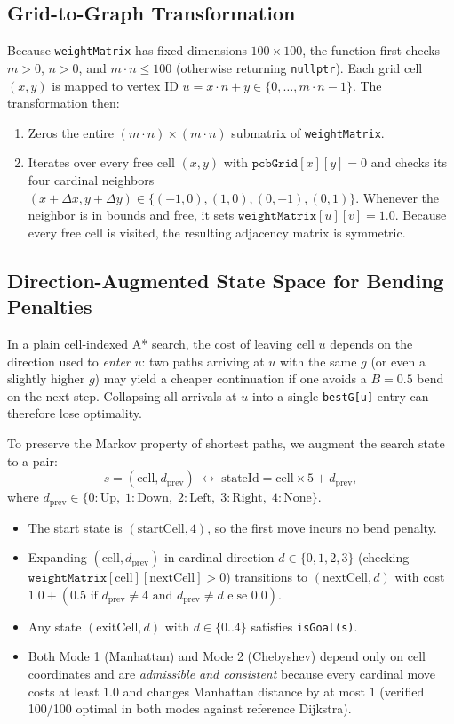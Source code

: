 \documentclass[11pt,a4paper]{article}
\begin{document}
\subsection{Grid-to-Graph Transformation}
Because \texttt{weightMatrix} has fixed dimensions $100 \times 100$, the function first checks $m > 0$, $n > 0$, and $m \cdot n \le 100$ (otherwise returning \texttt{nullptr}). Each grid cell $(x,y)$ is mapped to vertex ID $u = x \cdot n + y \in \{0, \dots, m \cdot n - 1\}$. The transformation then:
\begin{enumerate}
    \item Zeros the entire $(m \cdot n) \times (m \cdot n)$ submatrix of \texttt{weightMatrix}.
    \item Iterates over every free cell $(x,y)$ with $\texttt{pcbGrid}[x][y] = 0$ and checks its four cardinal neighbors $(x+\Delta x, y+\Delta y) \in \{(-1,0),(1,0),(0,-1),(0,1)\}$. Whenever the neighbor is in bounds and free, it sets $\texttt{weightMatrix}[u][v] = 1.0$. Because every free cell is visited, the resulting adjacency matrix is symmetric.
\end{enumerate}

\subsection{Direction-Augmented State Space for Bending Penalties}
In a plain cell-indexed A* search, the cost of leaving cell $u$ depends on the direction used to \emph{enter} $u$: two paths arriving at $u$ with the same $g$ (or even a slightly higher $g$) may yield a cheaper continuation if one avoids a $B = 0.5$ bend on the next step. Collapsing all arrivals at $u$ into a single \texttt{bestG[u]} entry can therefore lose optimality.

To preserve the Markov property of shortest paths, we augment the search state to a pair:
\[
    s = (\text{cell}, d_{\text{prev}}) \;\longleftrightarrow\; \text{stateId} = \text{cell} \times 5 + d_{\text{prev}},
\]
where $d_{\text{prev}} \in \{0:\text{Up},\; 1:\text{Down},\; 2:\text{Left},\; 3:\text{Right},\; 4:\text{None}\}$.
\begin{itemize}
    \item The start state is $(\text{startCell}, 4)$, so the first move incurs no bend penalty.
    \item Expanding $(\text{cell}, d_{\text{prev}})$ in cardinal direction $d \in \{0,1,2,3\}$ (checking $\texttt{weightMatrix}[\text{cell}][\text{nextCell}] > 0$) transitions to $(\text{nextCell}, d)$ with cost $1.0 + (0.5 \text{ if } d_{\text{prev}} \neq 4 \text{ and } d_{\text{prev}} \neq d \text{ else } 0.0)$.
    \item Any state $(\text{exitCell}, d)$ with $d \in \{0..4\}$ satisfies \texttt{isGoal(s)}.
    \item Both Mode 1 (Manhattan) and Mode 2 (Chebyshev) depend only on cell coordinates and are \emph{admissible and consistent} because every cardinal move costs at least $1.0$ and changes Manhattan distance by at most $1$ (verified 100/100 optimal in both modes against reference Dijkstra).
\end{itemize}
\end{document}
